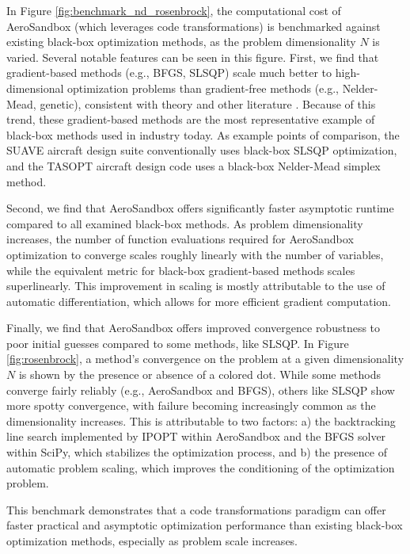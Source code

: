 In Figure \ref{fig:benchmark_nd_rosenbrock}, the computational cost of AeroSandbox (which leverages code transformations) is benchmarked against existing black-box optimization methods, as the problem dimensionality $N$ is varied. Several notable features can be seen in this figure. First, we find that gradient-based methods (e.g., BFGS, SLSQP) scale much better to high-dimensional optimization problems than gradient-free methods (e.g., Nelder-Mead, genetic), consistent with theory and other literature \cite{martins_engineering_2021, kochenderfer_algorithms_2019}. Because of this trend, these gradient-based methods are the most representative example of black-box methods used in industry today. As example points of comparison, the SUAVE aircraft design suite \cite{SUAVE2017} conventionally uses black-box SLSQP optimization, and the TASOPT aircraft design code \cite{drela_tasopt_2010} uses a black-box Nelder-Mead simplex method.

Second, we find that AeroSandbox offers significantly faster asymptotic runtime compared to all examined black-box methods. As problem dimensionality increases, the number of function evaluations required for AeroSandbox optimization to converge scales roughly linearly with the number of variables, while the equivalent metric for black-box gradient-based methods scales superlinearly. This improvement in scaling is mostly attributable to the use of automatic differentiation, which allows for more efficient gradient computation.

Finally, we find that AeroSandbox offers improved convergence robustness to poor initial guesses compared to some methods, like SLSQP. In Figure \ref{fig:rosenbrock}, a method's convergence on the problem at a given dimensionality $N$ is shown by the presence or absence of a colored dot. While some methods converge fairly reliably (e.g., AeroSandbox and BFGS), others like SLSQP show more spotty convergence, with failure becoming increasingly common as the dimensionality increases. This is attributable to two factors: a) the backtracking line search implemented by IPOPT within AeroSandbox and the BFGS solver within SciPy, which stabilizes the optimization process, and b) the presence of automatic problem scaling, which improves the conditioning of the optimization problem.

This benchmark demonstrates that a code transformations paradigm can offer faster practical and asymptotic optimization performance than existing black-box optimization methods, especially as problem scale increases.

